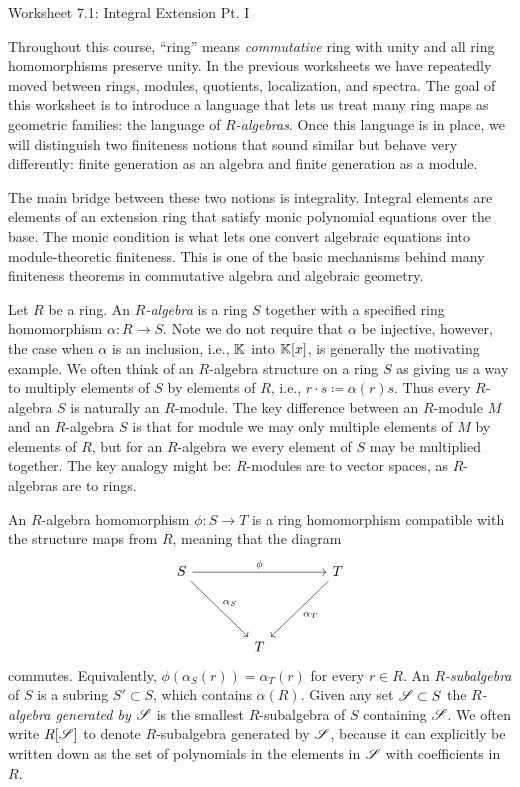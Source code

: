 \documentclass[Notebook.tex]{subfiles}
\begin{document}
\ifSubfilesClassLoaded{}{}

\begin{center}
    {Worksheet 7.1: Integral Extension Pt. I}
\end{center}

Throughout this course, ``ring'' means \textit{commutative} ring with unity and all ring homomorphisms preserve unity. In the previous worksheets we have repeatedly moved between rings, modules, quotients, localization, and spectra. The goal of this worksheet is to introduce a language that lets us treat many ring maps as geometric families: the language of \emph{$R$-algebras}. Once this language is in place, we will distinguish two finiteness notions that sound similar but behave very differently: finite generation as an algebra and finite generation as a module.

The main bridge between these two notions is integrality. Integral elements are elements of an extension ring that satisfy monic polynomial equations over the base. The monic condition is what lets one convert algebraic equations into module-theoretic finiteness. This is one of the basic mechanisms behind many finiteness theorems in commutative algebra and algebraic geometry.


Let $R$ be a ring. An \emph{$R$-algebra} is a ring $S$ together with a specified ring homomorphism $\alpha:R\longrightarrow S$. Note we do not require that $\alpha$ be injective, however, the case when $\alpha$ is an inclusion, i.e., $\mathbb K$ into $\mathbb K[x]$, is generally the motivating example. We often think of an $R$-algebra structure on a ring $S$ as giving us a way to multiply elements of $S$ by elements of $R$, i.e., $r \cdot s \coloneqq \alpha(r)s$. Thus every $R$-algebra $S$ is naturally an $R$-module. The key difference between an $R$-module $M$ and an $R$-algebra $S$ is that for module we may only multiple elements of $M$ by elements of $R$, but for an $R$-algebra we every element of $S$ may be multiplied together. The key analogy might be: $R$-modules are to vector spaces, as $R$-algebras are to rings. 

An $R$-algebra homomorphism $\phi:S\to T$ is a ring homomorphism compatible with the structure maps from $R$, meaning that the diagram
\[
\begin{tikzcd}[row sep=4em, column sep=4em]
S \arrow[rr, "\phi"] \arrow[dr, "\alpha_{S}"]& & T \arrow[dl, "\alpha_{T}"] \\
& T &
\end{tikzcd}
\]
commutes. Equivalently, $\phi(\alpha_S(r))=\alpha_{T}(r)$ for every $r\in R$. An \emph{$R$-subalgebra} of $S$ is a subring $S' \subset S$, which contains $\alpha(R)$. Given any set $\operatorname{\mathscr S} \subset S$ the \emph{$R$-algebra generated by $\operatorname{\mathscr S}$} is the smallest $R$-subalgebra of $S$ containing $\operatorname{\mathscr S}$. We often write $R[\operatorname{\mathscr S}]$ to denote $R$-subalgebra generated by $\operatorname{\mathscr S}$, because it can explicitly be written down as the set of polynomials in the elements in $\operatorname{\mathscr S}$ with coefficients in $R$.  
\end{document}
